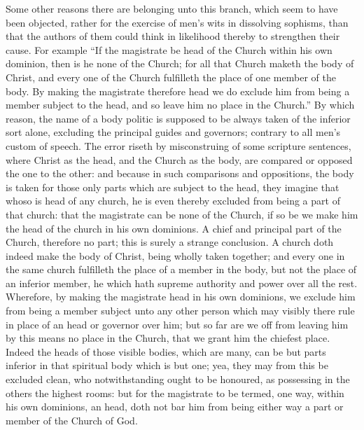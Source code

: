 Some other reasons there are belonging unto this branch, which seem to have been objected, rather for the exercise of men’s wits in dissolving sophisms, than that the authors of them could think in likelihood thereby to strengthen their cause. For example “If the magistrate be head of the Church within his own dominion, then is he none of the Church; for all that Church maketh the body of Christ, and every one of the Church fulfilleth the place of one member of the body. By making the magistrate therefore head we do exclude him from being a member subject to the head, and so leave him no place in the Church.” By which reason, the name of a body politic is supposed to be always taken of the inferior sort alone, excluding the principal guides and governors; contrary to all men’s custom of speech. The error riseth by misconstruing of some scripture sentences, where Christ as the head, and the Church as the body, are compared or opposed the one to the other: and because in such comparisons and oppositions, the body is taken for those only parts which are subject to the head, they imagine that whoso is head of any church, he is even thereby excluded from being a part of that church: that the magistrate can be none of the Church, if so be we make him the head of the church in his own dominions. A chief and principal part of the Church, therefore no part; this is surely a strange conclusion. A church doth indeed make the body of Christ, being wholly taken together; and every one in the same church fulfilleth the place of a member in the body, but not the place of an inferior member, he which hath supreme authority and power over all the rest. Wherefore, by making the magistrate head in his own dominions, we exclude him from being a member subject unto any other person which may visibly there rule in place of an head or governor over him; but so far are we off from leaving him by this means no place in the Church, that we grant him the chiefest place. Indeed the heads of those visible bodies, which are many, can be but parts inferior  in that spiritual body which is but one; yea, they may from this be excluded clean, who notwithstanding ought to be honoured, as possessing in the others the highest rooms: but for the magistrate to be termed, one way, within his own dominions, an head, doth not bar him from being either way a part or member of the Church of God.

